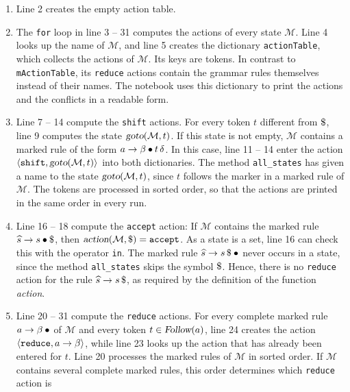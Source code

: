 \begin{enumerate}
\item Line 2 creates the empty action table.
\item The \texttt{for} loop in line 3 -- 31 computes the actions of every state $\mathcal{M}$.  Line 4 looks up the
      name of $\mathcal{M}$, and line 5 creates the dictionary \texttt{actionTable}, which collects the actions of
      $\mathcal{M}$.  Its keys are tokens.  In contrast to \texttt{mActionTable}, its \texttt{reduce} actions
      contain the grammar rules themselves instead of their names.  The notebook uses this dictionary to print
      the actions and the conflicts in a readable form.
\item Line 7 -- 14 compute the \texttt{shift} actions.  For every token $t$ different from $\symbol{36}$, line 9
      computes the state $\textsl{goto}(\mathcal{M}, t)$.  If this state is not empty, $\mathcal{M}$ contains a
      marked rule of the form $a \rightarrow \beta \mdot t\, \delta$.  In this case, line 11 -- 14 enter the
      action $\langle \texttt{shift}, \textsl{goto}(\mathcal{M}, t) \rangle$ into both dictionaries.  The method
      \texttt{all\_states} has given a name to the state $\textsl{goto}(\mathcal{M}, t)$, since $t$ follows the
      marker in a marked rule of $\mathcal{M}$.  The tokens are processed in sorted order, so that the actions are
      printed in the same order in every run.
\item Line 16 -- 18 compute the \texttt{accept} action:  If $\mathcal{M}$ contains the marked rule
      $\widehat{s} \rightarrow s \mdot \symbol{36}$, then $\textsl{action}(\mathcal{M}, \symbol{36}) =
      \texttt{accept}$.  As a state is a set, line 16 can check this with the operator \texttt{in}.  The marked rule $\widehat{s} \rightarrow s\, \symbol{36} \mdot$ never occurs in a
      state, since the method \texttt{all\_states} skips the symbol $\symbol{36}$.  Hence, there is no
      \texttt{reduce} action for the rule $\widehat{s} \rightarrow s\, \symbol{36}$, as required by the definition
      of the function \textsl{action}.
\item Line 20 -- 31 compute the \texttt{reduce} actions.  For every complete marked rule
      $a \rightarrow \beta \mdot$ of $\mathcal{M}$ and every token $t \in \textsl{Follow}(a)$, line 24 creates
      the action $\pair(\texttt{reduce}, a \rightarrow \beta)$, while line 23 looks up the action that has
      already been entered for $t$.  Line 20 processes the marked rules of $\mathcal{M}$ in sorted order.  If
      $\mathcal{M}$ contains several complete marked rules, this order determines which \texttt{reduce} action is

\end{enumerate}
